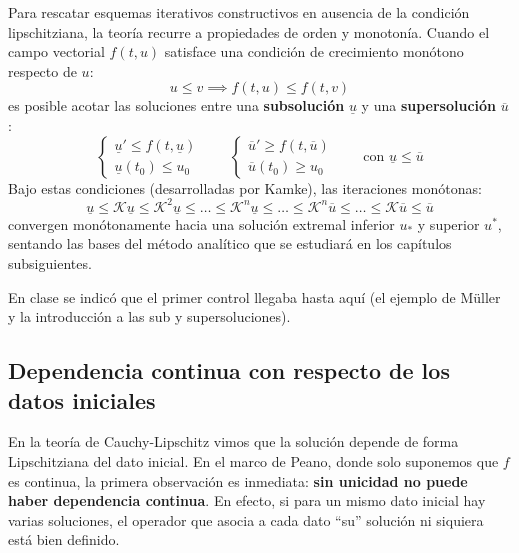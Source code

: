 Para rescatar esquemas iterativos constructivos en ausencia de la condición lipschitziana, la teoría recurre a propiedades de orden y monotonía. Cuando el campo vectorial $f(t, u)$ satisface una condición de crecimiento monótono respecto de $u$:
\[
    u \leq v \implies f(t, u) \leq f(t, v)
\]
es posible acotar las soluciones entre una \textbf{subsolución} $\underline{u}$ y una \textbf{supersolución} $\overline{u}$:
\[
    \begin{cases}
        \underline{u}' \leq f(t, \underline{u}) \\
        \underline{u}(t_0) \leq u_0
    \end{cases}
    \qquad
    \begin{cases}
        \overline{u}' \geq f(t, \overline{u}) \\
        \overline{u}(t_0) \geq u_0
    \end{cases}
    \qquad \text{con } \underline{u} \leq \overline{u}
\]
Bajo estas condiciones (desarrolladas por Kamke), las iteraciones monótonas:
\[
    \underline{u} \leq \mathcal{K}\underline{u} \leq \mathcal{K}^2\underline{u} \leq \dots \leq \mathcal{K}^n\underline{u} \leq \dots \leq \mathcal{K}^n\overline{u} \leq \dots \leq \mathcal{K}\overline{u} \leq \overline{u}
\]
convergen monótonamente hacia una solución extremal inferior $u_*$ y superior $u^*$, sentando las bases del método analítico que se estudiará en los capítulos subsiguientes.

\begin{observación}
    En clase se indicó que el primer control llegaba hasta aquí (el ejemplo de Müller y la introducción a las sub y supersoluciones).
\end{observación}

\subsection{Dependencia continua con respecto de los datos iniciales}

En la teoría de Cauchy-Lipschitz vimos que la solución depende de forma Lipschitziana del dato inicial. En el marco de Peano, donde solo suponemos que $f$ es continua, la primera observación es inmediata: \textbf{sin unicidad no puede haber dependencia continua}. En efecto, si para un mismo dato inicial hay varias soluciones, el operador que asocia a cada dato ``su'' solución ni siquiera está bien definido.

